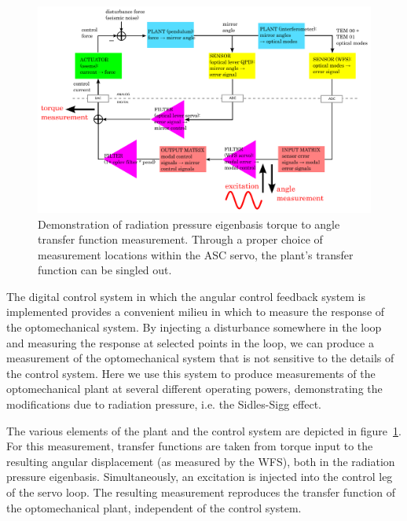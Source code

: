 \begin{figure}
\begin{centering}
\includegraphics[width=1.0\textwidth]{figures/ascservo_measurement.pdf}
\caption[Demonstration of radiation pressure eigenbasis torque to
  angle transfer function measurement]{Demonstration of radiation pressure eigenbasis torque to
  angle transfer function measurement. Through a proper choice of measurement
  locations within the ASC servo, the plant's transfer function can be
  singled out.}
\label{fig:RPTFmeasurement}
\end{centering}
\end{figure}

The digital control system in which the angular control feedback
system is implemented provides a convenient milieu in which to measure
the response of the optomechanical system.  By injecting a disturbance
somewhere in the loop and measuring the response at selected points in
the loop, we can produce a measurement of the optomechanical system
that is not sensitive to the details of the control system.   Here we
use this system to produce measurements of the optomechanical plant at
several different operating powers, demonstrating the modifications due
to radiation pressure, i.e. the Sidles-Sigg effect.

The various elements of the plant and the control system are depicted
in figure~\ref{fig:RPTFmeasurement}.  For this measurement, transfer
functions are taken from torque input to the resulting angular
displacement (as measured by the WFS), both in the radiation pressure
eigenbasis.  Simultaneously, an excitation is injected into the
control leg of the servo loop.  The resulting measurement reproduces
the transfer function of the optomechanical plant, independent of the
control system.

